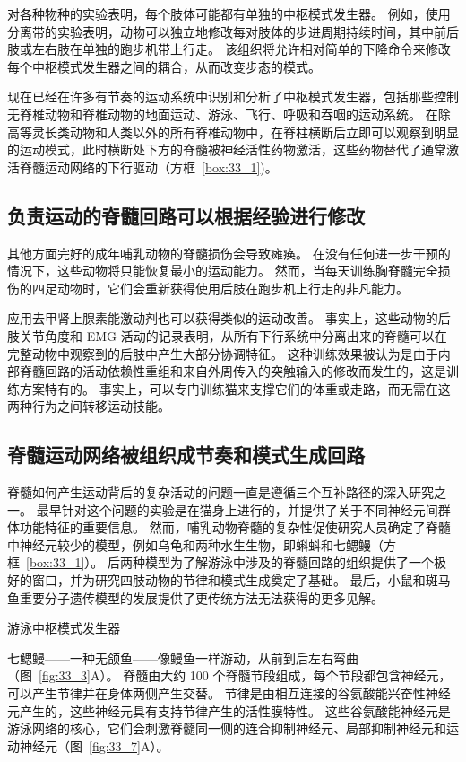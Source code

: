 对各种物种的实验表明，每个肢体可能都有单独的中枢模式发生器。
例如，使用分离带的实验表明，动物可以独立地修改每对肢体的步进周期持续时间，其中前后肢或左右肢在单独的跑步机带上行走。
该组织将允许相对简单的下降命令来修改每个中枢模式发生器之间的耦合，从而改变步态的模式。


现在已经在许多有节奏的运动系统中识别和分析了中枢模式发生器，包括那些控制无脊椎动物和脊椎动物的地面运动、游泳、飞行、呼吸和吞咽的运动系统。
在除高等灵长类动物和人类以外的所有脊椎动物中，在脊柱横断后立即可以观察到明显的运动模式，此时横断处下方的脊髓被神经活性药物激活，这些药物替代了通常激活脊髓运动网络的下行驱动（方框~\ref{box:33_1})。



\subsection{负责运动的脊髓回路可以根据经验进行修改}

其他方面完好的成年哺乳动物的脊髓损伤会导致瘫痪。 在没有任何进一步干预的情况下，这些动物将只能恢复最小的运动能力。
然而，当每天训练胸脊髓完全损伤的四足动物时，它们会重新获得使用后肢在跑步机上行走的非凡能力。


应用去甲肾上腺素能激动剂也可以获得类似的运动改善。
事实上，这些动物的后肢关节角度和 EMG 活动的记录表明，从所有下行系统中分离出来的脊髓可以在完整动物中观察到的后肢中产生大部分协调特征。
这种训练效果被认为是由于内部脊髓回路的活动依赖性重组和来自外周传入的突触输入的修改而发生的，这是训练方案特有的。
事实上，可以专门训练猫来支撑它们的体重或走路，而无需在这两种行为之间转移运动技能。



\subsection{脊髓运动网络被组织成节奏和模式生成回路}

脊髓如何产生运动背后的复杂活动的问题一直是遵循三个互补路径的深入研究之一。
最早针对这个问题的实验是在猫身上进行的，并提供了关于不同神经元间群体功能特征的重要信息。
然而，哺乳动物脊髓的复杂性促使研究人员确定了脊髓中神经元较少的模型，例如乌龟和两种水生生物，即蝌蚪和七鳃鳗（方框~\ref{box:33_1}）。
后两种模型为了解游泳中涉及的脊髓回路的组织提供了一个极好的窗口，并为研究四肢动物的节律和模式生成奠定了基础。
最后，小鼠和斑马鱼重要分子遗传模型的发展提供了更传统方法无法获得的更多见解。


游泳中枢模式发生器

七鳃鳗——一种无颌鱼——像鳗鱼一样游动，从前到后左右弯曲（图~\ref{fig:33_3}A）。
脊髓由大约 100 个脊髓节段组成，每个节段都包含神经元，可以产生节律并在身体两侧产生交替。
节律是由相互连接的谷氨酸能兴奋性神经元产生的，这些神经元具有支持节律产生的活性膜特性。
这些谷氨酸能神经元是游泳网络的核心，它们会刺激脊髓同一侧的连合抑制神经元、局部抑制神经元和运动神经元（图~\ref{fig:33_7}A）。



